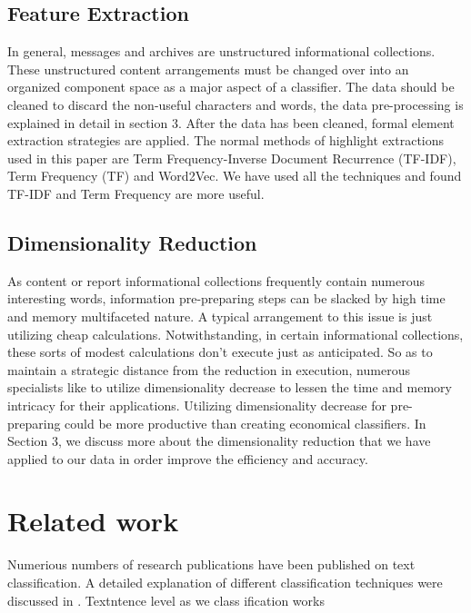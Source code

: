 \documentclass[conference]{IEEEtran}
\begin{document}
\subsection{Feature Extraction} 
In general, messages and archives are unstructured informational collections. These unstructured content arrangements must be changed over into an organized component space as a major aspect of a classifier. The data should be cleaned to discard the non-useful characters and words, the data pre-processing is explained in detail in section 3. After the data has been cleaned, formal element extraction strategies are applied. The normal methods of highlight extractions used in this paper are Term Frequency-Inverse Document Recurrence (TF-IDF), Term Frequency (TF) and Word2Vec.
We have used all the techniques and found TF-IDF and Term Frequency are more useful. 
\subsection{Dimensionality Reduction} 
As content or report informational collections frequently contain numerous interesting words, information pre-preparing steps can be slacked by high time and memory multifaceted nature. A typical arrangement to this issue is just utilizing cheap calculations. Notwithstanding, in certain informational collections, these sorts of modest calculations don't execute just as anticipated. So as to maintain a strategic distance from the reduction in execution, numerous specialists like to utilize dimensionality decrease to lessen the time and memory intricacy for their applications. Utilizing dimensionality decrease for pre-preparing could be more productive than creating economical classifiers. 
In Section 3, we discuss more about the dimensionality reduction that we have applied to our data in order improve the efficiency and accuracy. 

\section{Related work}
Numerious numbers of research publications have been published on text classification. A detailed explanation of different classification techniques were discussed in \cite{b1}. 
Textntence level as we  class ification works 
\end{document}
